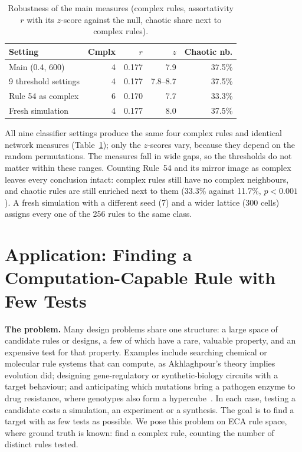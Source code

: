 \documentclass[10pt,letterpaper,twocolumn]{article}
\newcommand{\para}[1]{\textbf{#1}\hspace{0.4em}}
\begin{document}
\begin{table}[t]
\caption{Robustness of the main measures (complex rules, assortativity $r$ with its $z$-score against the null, chaotic share next to complex rules).}
\label{tab:robust}
\centering\small\setlength{\tabcolsep}{4pt}
\begin{tabular}{@{}lrrrr@{}}
\toprule
Setting & Cmplx & $r$ & $z$ & Chaotic nb. \\
\midrule
Main (0.4, 600) & 4 & 0.177 & 7.9 & 37.5\% \\
9 threshold settings & 4 & 0.177 & 7.8--8.7 & 37.5\% \\
Rule 54 as complex & 6 & 0.170 & 7.7 & 33.3\% \\
Fresh simulation & 4 & 0.177 & 8.0 & 37.5\% \\
\bottomrule
\end{tabular}
\end{table}

All nine classifier settings produce the same four complex rules and identical network measures (Table~\ref{tab:robust}); only the $z$-scores vary, because they depend on the random permutations. The measures fall in wide gaps, so the thresholds do not matter within these ranges. Counting Rule~54 and its mirror image as complex leaves every conclusion intact: complex rules still have no complex neighbours, and chaotic rules are still enriched next to them (33.3\% against 11.7\%, $p<0.001$). A fresh simulation with a different seed (7) and a wider lattice (300 cells) assigns every one of the 256 rules to the same class.

\section{Application: Finding a Computation-Capable Rule with Few Tests}

\para{The problem.} Many design problems share one structure: a large space of candidate rules or designs, a few of which have a rare, valuable property, and an expensive test for that property. Examples include searching chemical or molecular rule systems that can compute, as Akhlaghpour's theory implies evolution did; designing gene-regulatory or synthetic-biology circuits with a target behaviour; and anticipating which mutations bring a pathogen enzyme to drug resistance, where genotypes also form a hypercube~\cite{weinreich2006}. In each case, testing a candidate costs a simulation, an experiment or a synthesis. The goal is to find a target with as few tests as possible. We pose this problem on ECA rule space, where ground truth is known: find a complex rule, counting the number of distinct rules tested.
\end{document}
